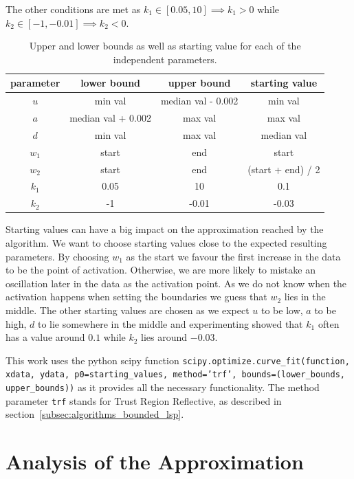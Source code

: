 The other conditions are met as $k_1 \in [0.05, 10] \implies k_1 > 0$ while $k_2 \in [-1, -0.01] \implies k_2 < 0$.

\begin{table}[h!]
	\centering
	\begin{tabular}{|c|c|c|c|}
		\hline
		parameter & lower bound & upper bound & starting value \\ 
		\hline
		$u$ & min val & median val - 0.002 & min val\\
		\hline
		$a$ & median val + 0.002 & max val & max val\\
		\hline
		$d$ & min val & max val & median val\\
		\hline
		$w_1$ & start & end & start\\
		\hline
		$w_2$ & start & end & (start + end) / 2\\
		\hline
		$k_1$ & 0.05 & 10 & 0.1\\
		\hline
		$k_2$ & -1 & -0.01 & -0.03\\
		\hline
	\end{tabular}
	\label{tab:boundaries_and_starting_vals}
	\caption{Upper and lower bounds as well as starting value for each of the independent parameters.}
\end{table}

Starting values can have a big impact on the approximation reached by the algorithm. We want to choose starting values close to the expected resulting parameters. By choosing $w_1$ as the start we favour the first increase in the data to be the point of activation. Otherwise, we are more likely to mistake an oscillation later in the data as the activation point. As we do not know when the activation happens when setting the boundaries we guess that $w_2$ lies in the middle. The other starting values are chosen as we expect $u$ to be low, $a$ to be high, $d$ to lie somewhere in the middle and experimenting showed that $k_1$ often has a value around $0.1$ while $k_2$ lies around $-0.03$.

This work uses the python scipy function \texttt{scipy.optimize.curve\_fit(function, xdata, ydata, p0=starting\_values, method='trf', bounds=(lower\_bounds, upper\_bounds))} as it provides all the necessary functionality. The method parameter \texttt{trf} stands for Trust Region Reflective, as described in section~\ref{subsec:algorithms_bounded_lsp}.

\section{Analysis of the Approximation}

